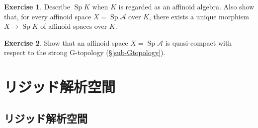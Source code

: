 \documentclass[a4paper,12pt, dvipdfmx]{jsbook}
\def\Sp{\mathop{\mathrm{Sp}}\nolimits}
\theoremstyle{plain}
\theoremstyle{definition}
\newtheorem{exer}{\bfseries Exercise}[chapter]
\newcounter{chushaku}
\begin{document}
\begin{exer}\label{exer-affinoidstructuralmap}{\rm 
Describe $\Sp K$ when $K$ is regarded as an affinoid algebra.
Also show that, for every affinoid space $X=\Sp\mathcal{A}$ over $K$, there exists a unique morphism $X\rightarrow\Sp K$ of affinoid spaces over $K$.}
\end{exer}

\begin{exer}\label{exer-affinoidquasicompact}{\rm 
Show that an affinoid space $X=\Sp\mathcal{A}$ is quasi-compact with respect to the strong G-topology (\S\ref{sub-Gtopology}).}
\end{exer}










\setcounter{chushaku}{0}
\chapter{リジッド解析空間}\label{CH-RIGIDSPACES}
\section{リジッド解析空間}\label{sec-rigidspaces}
\end{document}
